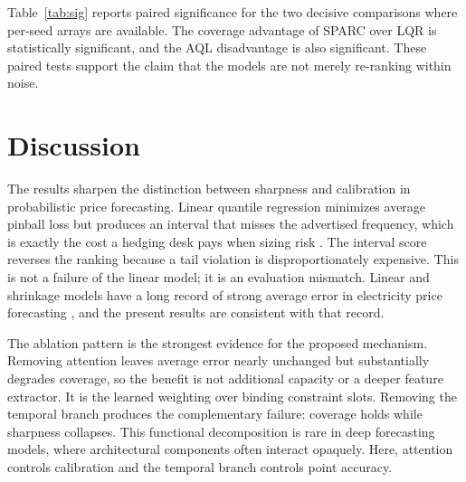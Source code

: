 \documentclass[twoside]{article}
\begin{document}
Table~\ref{tab:sig} reports paired significance for the two decisive comparisons where per-seed arrays are available. The coverage advantage of SPARC over LQR is statistically significant, and the AQL disadvantage is also significant. These paired tests support the claim that the models are not merely re-ranking within noise.

\begin{table}[t]
\centering
\small
\caption{Paired comparisons between SPARC and the two methods that define the decision trade-off. Difference is SPARC minus the comparison method. p-values are shown where paired per-seed series are available.}
\label{tab:sig}
\end{table}

\section{Discussion}
The results sharpen the distinction between sharpness and calibration in probabilistic price forecasting. Linear quantile regression minimizes average pinball loss but produces an interval that misses the advertised frequency, which is exactly the cost a hedging desk pays when sizing risk \citep{bracher2021evaluating, hobbs2022probabilistic}. The interval score reverses the ranking because a tail violation is disproportionately expensive. This is not a failure of the linear model; it is an evaluation mismatch. Linear and shrinkage models have a long record of strong average error in electricity price forecasting \citep{lago2020forecasting}, and the present results are consistent with that record.

The ablation pattern is the strongest evidence for the proposed mechanism. Removing attention leaves average error nearly unchanged but substantially degrades coverage, so the benefit is not additional capacity or a deeper feature extractor. It is the learned weighting over binding constraint slots. Removing the temporal branch produces the complementary failure: coverage holds while sharpness collapses. This functional decomposition is rare in deep forecasting models, where architectural components often interact opaquely. Here, attention controls calibration and the temporal branch controls point accuracy.
\end{document}
